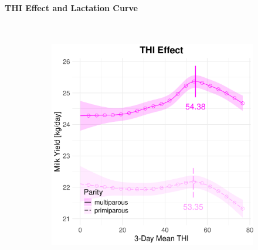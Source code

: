 \newpage
\paragraph{THI Effect and Lactation Curve} \quad \\
\begin{figure}[H]
    \centering
    \begin{subfigure}[b]{0.45\textwidth}
        \centering
        \includegraphics[width=\textwidth]{thesis/figures/models/milk/full/sf_milk_full/sf_milk_full_marginal_thi_milk_combined.png}
    \end{subfigure}
    \hspace{0.05\textwidth} %
    \begin{subfigure}[b]{0.45\textwidth}
        \centering

\end{subfigure}
\end{figure}
